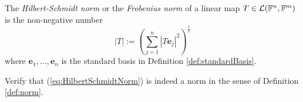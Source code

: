 \begin{defn}
  \label{def:HilbertSchmidtNorm}
  The \emph{Hilbert-Schmidt norm} or the \emph{Frobenius norm}
  of a linear map
  \mbox{$T\in {\cal L}(\mathbb{F}^n,\mathbb{F}^m)$}
  is the non-negative number 
  \begin{equation}
    \label{eq:HilbertSchmidtNorm}
    |T| := \left(
      \sum_{j=1}^n \left|T \mathbf{e}_j\right|^2
    \right)^{\frac{1}{2}}
  \end{equation}
  where $\mathbf{e}_1, \ldots, \mathbf{e}_n$
  is the standard basis %
  in Definition \ref{def:standardBasis}.
\end{defn}

\begin{exc}
  Verify that (\ref{eq:HilbertSchmidtNorm})
  is indeed a norm in the sense of Definition \ref{def:norm}.
\end{exc}
